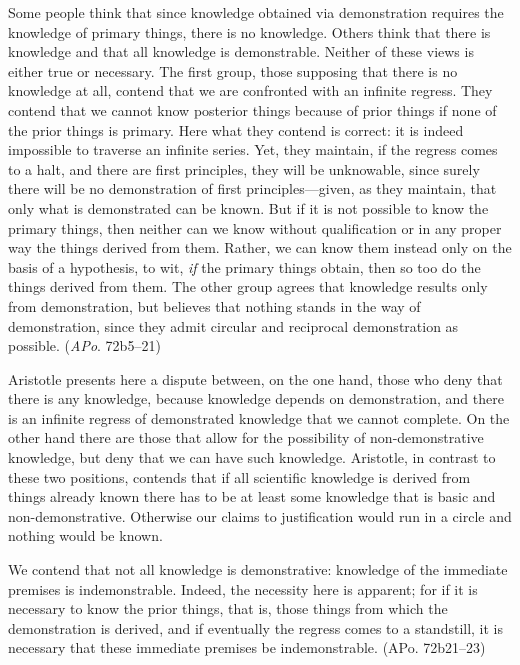 \documentclass[12pt]{article}
\begin{document}
\begin{quote-b}
Some people think that since knowledge obtained via demonstration requires the
knowledge of primary things, there is no knowledge. Others think that there is
knowledge and that all knowledge is demonstrable. Neither of these views is either
true or necessary. The first group, those supposing that there is no knowledge at
all, contend that we are confronted with an infinite regress. They contend that we
cannot know posterior things because of prior things if none of the prior things is
primary. Here what they contend is correct: it is indeed impossible to traverse an
infinite series. Yet, they maintain, if the regress comes to a halt, and there are
first principles, they will be unknowable, since surely there will be no
demonstration of first principles---given, as they maintain, that only what is
demonstrated can be known. But if it is not possible to know the primary things,
then neither can we know without qualification or in any proper way the things
derived from them. Rather, we can know them instead only on the basis of a
hypothesis, to wit, \emph{if} the primary things obtain, then so too do the things derived
from them. The other group agrees that knowledge results only from demonstration,
but believes that nothing stands in the way of demonstration, since they admit
circular and reciprocal demonstration as possible. (\emph{APo}. 72b5--21)
\end{quote-b}

Aristotle presents here a dispute between, on the one hand, those who deny that there
is any knowledge, because knowledge depends on demonstration, and there is an
infinite regress of demonstrated knowledge that we cannot complete. On the other hand
there are those that allow for the possibility of non-demonstrative knowledge, but
deny that we can have such knowledge. Aristotle, in contrast to these two positions,
contends that if all scientific knowledge is derived from things already known there
has to be at least some knowledge that is basic and non-demonstrative. Otherwise our
claims to justification would run in a circle and nothing would be known.

\begin{quote-b}
We contend that not all knowledge is demonstrative: knowledge of the immediate
premises is indemonstrable. Indeed, the necessity here is apparent; for if it is
necessary to know the prior things, that is, those things from which the
demonstration is derived, and if eventually the regress comes to a standstill, it
is necessary that these immediate premises be indemonstrable. (APo. 72b21--23)
\end{quote-b}
\end{document}
